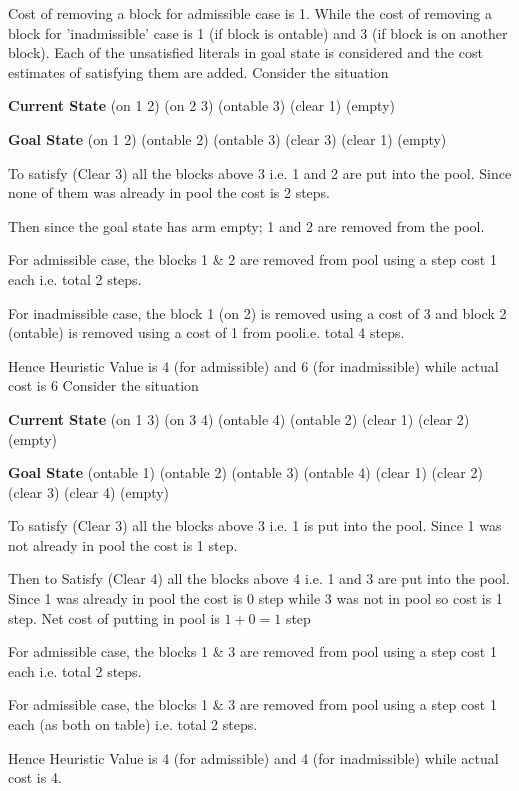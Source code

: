 \documentclass[32pt]{article}
\begin{document}
Cost of removing a block for admissible case is 1.
While the cost of removing a block for 'inadmissible' case is 1 (if block is ontable) and 3 (if block is on another block). Each of the unsatisfied literals in goal state is considered and the cost estimates of satisfying them are added.
\vfill
Consider the situation

\begin{center}
\textbf{Current State}
(on 1 2) (on 2 3) (ontable 3) (clear 1) (empty)

\textbf{Goal State}
(on 1 2) (ontable 2) (ontable 3) (clear 3) (clear 1) (empty)
\end{center}


To satisfy (Clear 3) all the blocks above 3 i.e. 1 and 2 are put into the pool. Since none of them was already in pool the cost is 2 steps.

Then since the goal state has arm empty; 1 and 2 are removed from the pool.

For admissible case, the blocks 1 & 2 are removed from pool using a step cost 1 each i.e. total 2 steps.

For inadmissible case, the block 1 (on 2) is removed using a cost of 3 and block 2 (ontable) is removed using a cost of 1 from pooli.e. total 4 steps.

Hence Heuristic Value is 4 (for admissible) and 6 (for inadmissible) while actual cost is 6
\vfill
\newpage
Consider the situation

\begin{center}
\textbf{Current State}
(on 1 3) (on 3 4) (ontable 4) (ontable 2) (clear 1) (clear 2) (empty)

\textbf{Goal State}
(ontable 1) (ontable 2) (ontable 3) (ontable 4) (clear 1) (clear 2) (clear 3) (clear 4) (empty)
\end{center}

To satisfy (Clear 3) all the blocks above 3 i.e. 1 is put into the pool. Since 1 was  not already in pool the cost is 1 step.

Then to Satisfy (Clear 4) all the blocks above 4 i.e. 1 and 3 are put into the pool. Since 1 was already in pool the cost is 0 step while 3 was not in pool so cost is 1 step. Net cost of putting in pool is $1 + 0 = 1$ step

For admissible case, the blocks 1 & 3 are removed from pool using a step cost 1 each i.e. total 2 steps.

For admissible case, the blocks 1 & 3 are removed from pool using a step cost 1 each (as both on table) i.e. total 2 steps.

Hence Heuristic Value is 4 (for admissible) and 4 (for inadmissible) while actual cost is 4.
\end{document}
